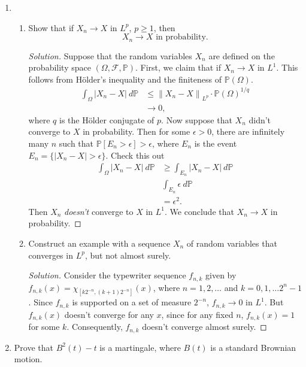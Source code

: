 \documentclass[11pt,letterpaper]{report}
\newcommand{\mcal}[1]{\mathcal{#1}}
\newcommand{\Lp}[2]{\left\|{#1}\right\|_{L^{#2}}}
\newcommand{\prob}{\mathbb{P}}
\newenvironment{solution}
{\begin{proof}[Solution]}
{\end{proof}}
\begin{document}
\begin{enumerate}
	\item \begin{enumerate}
		\item Show that if $X_n\to X$ in $L^p$, $p\geq 1$, then
		\[
		X_n\to X\text{ in probability.}
		\]
		\begin{solution}
			Suppose that the random variables $X_n$ are defined on the probability space $(\Omega, \mcal{F}, \prob)$. First, we claim that if $X_n\to X$ in $L^1$. This follows from H\"older's inequality and the finiteness of $\prob(\Omega)$.
			\begin{align*}
				\int_\Omega|X_n - X|\ d\prob &\leq \Lp{X_n - X}{p}\cdot \prob(\Omega)^{1/q}\\
				&\to 0,
			\end{align*}
			where $q$ is the H\"older conjugate of $p$. Now suppose that $X_n$ didn't converge to $X$ in probability. Then for some $\epsilon>0$, there are infinitely many $n$ such that $\prob[E_n>\epsilon] > \epsilon$, where $E_n$ is the event $E_n = \{|X_n - X|>\epsilon\}$. Check this out
			\begin{align*}
				\int_\Omega|X_n - X|\ d\prob &\geq \int_{E_n}|X_n - X|\ d\prob\\
				& \int_{E_n}\epsilon\ d\prob\\
				&= \epsilon^2.
			\end{align*}
			Then $X_n$ \textit{doesn't} converge to $X$ in $L^1$. We conclude that $X_n\to X$ in probability.
		\end{solution}

		\item Construct an example with a sequence $X_n$ of random variables that converges in $L^p$, but not almost surely.
		\begin{solution}
			Consider the typewriter sequence $f_{n,k}$ given by $f_{n,k}(x) = \chi_{[k2^{-n}, (k+1)2^{-n}]}(x)$, where $n = 1, 2, \ldots$ and $k = 0, 1, \ldots 2^n-1$. Since $f_{n,k}$ is supported on a set of measure $2^{-n}$, $f_{n,k}\to 0$ in $L^1$. But $f_{n,k}(x)$ doesn't converge for any $x$, since for any fixed $n$, $f_{n,k}(x) = 1$ for some $k$. Consequently, $f_{n,k}$ doesn't converge almost surely.
		\end{solution}
	\end{enumerate}

	\item Prove that $B^2(t) - t$ is a martingale, where $B(t)$ is a standard Brownian motion.
\end{enumerate}
\end{document}
